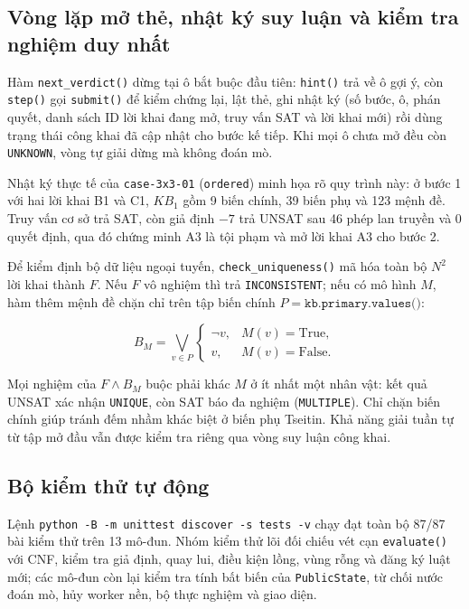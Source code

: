 \clearpage

\subsection{Vòng lặp mở thẻ, nhật ký suy luận và kiểm tra nghiệm duy nhất}

Hàm \texttt{next\_verdict()} dừng tại ô bắt buộc đầu tiên: \texttt{hint()} trả về ô gợi ý, còn \texttt{step()} gọi \texttt{submit()} để kiểm chứng lại, lật thẻ, ghi nhật ký (số bước, ô, phán quyết, danh sách ID lời khai đang mở, truy vấn SAT và lời khai mới) rồi dùng trạng thái công khai đã cập nhật cho bước kế tiếp. Khi mọi ô chưa mở đều còn \texttt{UNKNOWN}, vòng tự giải dừng mà không đoán mò.

Nhật ký thực tế của \texttt{case-3x3-01} (\texttt{ordered}) minh họa rõ quy trình này: ở bước 1 với hai lời khai B1 và C1, $KB_1$ gồm 9 biến chính, 39 biến phụ và 123 mệnh đề. Truy vấn cơ sở trả SAT, còn giả định $-7$ trả UNSAT sau 46 phép lan truyền và 0 quyết định, qua đó chứng minh A3 là tội phạm và mở lời khai A3 cho bước 2.

Để kiểm định bộ dữ liệu ngoại tuyến, \texttt{check\_uniqueness()} mã hóa toàn bộ $N^2$ lời khai thành $F$. Nếu $F$ vô nghiệm thì trả \texttt{INCONSISTENT}; nếu có mô hình $M$, hàm thêm mệnh đề chặn chỉ trên tập biến chính $P=\texttt{kb.primary.values()}$:

\[
B_M=\bigvee_{v\in P}\begin{cases}\neg v,&M(v)=\mathrm{True},\\v,&M(v)=\mathrm{False}.\end{cases}
\]

Mọi nghiệm của $F\land B_M$ buộc phải khác $M$ ở ít nhất một nhân vật: kết quả UNSAT xác nhận \texttt{UNIQUE}, còn SAT báo đa nghiệm (\texttt{MULTIPLE}). Chỉ chặn biến chính giúp tránh đếm nhầm khác biệt ở biến phụ Tseitin. Khả năng giải tuần tự từ tập mở đầu vẫn được kiểm tra riêng qua vòng suy luận công khai.

\subsection{Bộ kiểm thử tự động}

Lệnh \texttt{python -B -m unittest discover -s tests -v} chạy đạt toàn bộ 87/87 bài kiểm thử trên 13 mô-đun. Nhóm kiểm thử lõi đối chiếu vét cạn \texttt{evaluate()} với CNF, kiểm tra giả định, quay lui, điều kiện lồng, vùng rỗng và đăng ký luật mới; các mô-đun còn lại kiểm tra tính bất biến của \texttt{PublicState}, từ chối nước đoán mò, hủy worker nền, bộ thực nghiệm và giao diện.

